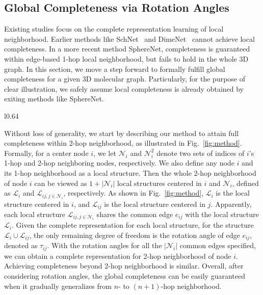 \documentclass{article}
\begin{document}
\subsection{Global Completeness via Rotation Angles}   \label{sec:global}
Existing studies focus on the complete representation learning of local neighborhood.
Earlier methods like SchNet~\citep{schutt2017schnet} and DimeNet~\cite{klicpera_dimenet_2020} cannot \textcolor{COLOR}{achieve} local completeness.
In a more recent method SphereNet, completeness is guaranteed within \textcolor{COLOR}{edge-based 1-hop} local neighborhood,
but fails to hold in the whole 3D graph. 
In this section, we move a step forward to
formally fulfill global completeness  
for a given 3D molecular graph.
Particularly, for the purpose of clear illustration, we safely assume local completeness is already obtained by exiting methods like SphereNet.

\begin{wrapfigure}[14]{l}{0.64\textwidth}\vspace{-20 pt}
     \centering
     \quad
     \vspace{-6 pt}
    \caption{Illustrations of how to achieve global completeness in our proposed methods.}
    \label{fig:method}
    \vspace{-10 pt}
\end{wrapfigure}

Without loss of generality, we start by describing our method
to attain full completeness within 2-hop neighborhood, as illustrated in Fig.~\ref{fig:method}.
Formally, for a center node $i$, we let $\mathcal{N}_i$ and $\mathcal{N}^2_i$ denote two sets of indices of $i$'s 1-hop
and 2-hop neighboring nodes, respectively.
We also define any node $i$ and its 1-hop neighborhood as a local structure.
Then the whole 2-hop neighborhood of node $i$
can be viewed as $1+|\mathcal{N}_i|$ local structures centered in $i$ and $\mathcal{N}_i$, defined as 
$\mathcal{L}_{i}$ and $\mathcal{L}_{ij, j\in \mathcal{N}_i}$, respectively. 
\textcolor{COLOR}{As shown in Fig.~\ref{fig:method}, $\mathcal{L}_{i}$ is the local structure centered in $i$, and $\mathcal{L}_{ij}$ is the local structure centered in $j$.}
Apparently, each local structure $\mathcal{L}_{ij, j\in \mathcal{N}_i}$ shares the common edge $e_{ij}$ with the local structure $\mathcal{L}_{i}$.
Given the complete representation for each local structure, for the structure $\mathcal{L}_{i} \cup \mathcal{L}_{ij}$, the only remaining degree of freedom is the rotation angle of edge $e_{ij}$, denoted as $\tau_{ij}$.
With the rotation angles for all the $|\mathcal{N}_i|$ common edges specified, we can obtain a complete representation for 2-hop neighborhood of node $i$. 
Achieving completeness beyond 2-hop neighborhood is similar.
Overall, after considering rotation angles, the global completeness can be easily guaranteed when it gradually generalizes from $n$- to $(n+1)$-hop neighborhood.
\end{document}
